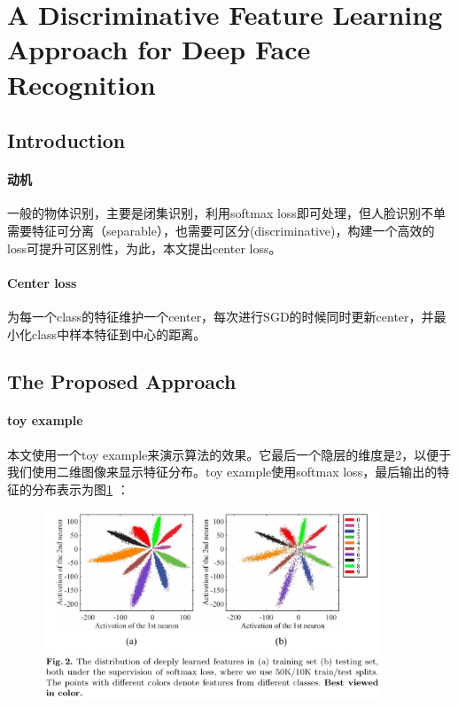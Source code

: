 \documentclass[10pt,letterpaper]{article}
\begin{document}
\newpage
\section{A Discriminative Feature Learning Approach for Deep Face Recognition \cite{centerloss}}
\subsection{Introduction}
\paragraph{动机} 一般的物体识别，主要是闭集识别，利用softmax loss即可处理，但人脸识别不单需要特征可分离（separable），也需要可区分(discriminative)，构建一个高效的loss可提升可区别性，为此，本文提出center loss。

\paragraph{Center loss} 为每一个class的特征维护一个center，每次进行SGD的时候同时更新center，并最小化class中样本特征到中心的距离。
\subsection{The Proposed Approach}
\paragraph{toy example} 本文使用一个toy example来演示算法的效果。它最后一个隐层的维度是2，以便于我们使用二维图像来显示特征分布。toy example使用softmax loss，最后输出的特征的分布表示为图\ref{softmax-loss-2-d} ：
\begin{figure}[H]
	\centering
	\includegraphics[width=0.9\textwidth]{../images/softmax-loss-2-d.png}
	\caption{}
	\label{softmax-loss-2-d}
\end{figure}
\end{document}
